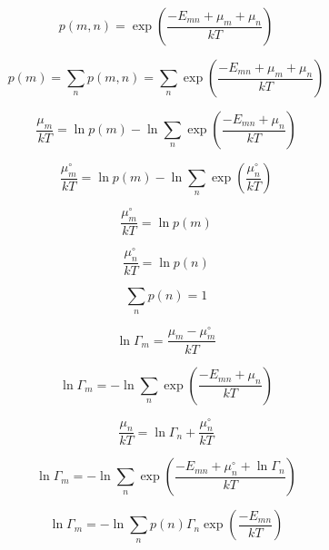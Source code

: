 \documentclass[3p]{elsarticle}
\begin{document}
\begin{equation}
p(m,n) = \exp\left(\displaystyle\frac{-E_{mn}+\mu_m+\mu_n}{kT}\right)
\end{equation}

\begin{equation}
p(m) = \displaystyle\sum_np(m,n) =
\displaystyle\sum_n\exp\left(\displaystyle\frac{-E_{mn}+\mu_m+\mu_n}{kT}\right)
\end{equation}

\begin{equation}
\frac{\mu_m}{kT} = \ln p(m) -
\ln\displaystyle\sum_n\exp\left(\displaystyle\frac{-E_{mn}+\mu_n}{kT}\right)
\end{equation}

\begin{equation}
\frac{\mu_m^{\circ}}{kT} = \ln p(m) -
\ln\displaystyle\sum_n\exp\left(\displaystyle\frac{\mu_n^{\circ}}{kT}\right)
\end{equation}

\begin{equation}
\frac{\mu_m^{\circ}}{kT} = \ln p(m)
\end{equation}

\begin{equation}
\frac{\mu_n^{\circ}}{kT} = \ln p(n)
\end{equation}

\begin{equation}
\displaystyle\sum_np(n)=1
\end{equation}

\begin{equation}
\ln\Gamma_m = \frac{\mu_m - \mu_m^{\circ}}{kT}
\end{equation}

\begin{equation}
\ln\Gamma_m = -
\ln\displaystyle\sum_n\exp\left(\displaystyle\frac{-E_{mn}+\mu_n}{kT}\right)
\end{equation}

\begin{equation}
\frac{\mu_n}{kT} = \ln\Gamma_n + \frac{\mu_n^{\circ}}{kT}
\end{equation}

\begin{equation}
\ln\Gamma_m = -
\ln\displaystyle\sum_n\exp\left(\displaystyle\frac{-E_{mn}+\mu_n^{\circ}+\ln\Gamma_n}{kT}\right)
\end{equation}

\begin{equation}
\ln\Gamma_m = -
\ln\displaystyle\sum_np(n)\Gamma_n\exp\left(\displaystyle\frac{-E_{mn}}{kT}\right)
\end{equation}


\end{document}
